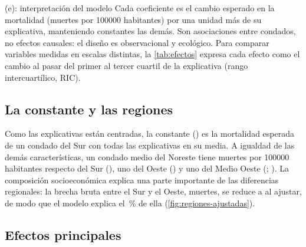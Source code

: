 \begin{entregable}{(e): interpretación del modelo}
Cada coeficiente es el cambio esperado en la mortalidad (muertes por \num{100000} habitantes) por
una unidad más de su explicativa, manteniendo constantes las demás. Son asociaciones entre
condados, no efectos causales: el diseño es observacional y ecológico. Para comparar variables
medidas en escalas distintas, la \cref{tab:efectos} expresa cada efecto como el cambio al pasar del
primer al tercer cuartil de la explicativa (rango intercuartílico, RIC).
\end{entregable}

\subsection{La constante y las regiones}

Como las explicativas están centradas, la constante () es la mortalidad esperada de un
condado del Sur con todas las explicativas en su media. A igualdad de las demás características, un
condado medio del Noreste tiene  muertes por \num{100000} habitantes respecto del
Sur (), uno del Oeste  () y uno del Medio Oeste
 (; ). La composición socioeconómica
explica una parte importante de las diferencias regionales: la brecha bruta entre el Sur y el Oeste,
 muertes, se reduce a  al ajustar, de modo que el modelo
explica el \,\% de ella (\cref{fig:regiones-ajustadas}).


\subsection{Efectos principales}


